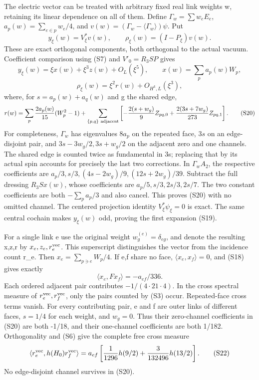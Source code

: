 The electric vector can be treated with arbitrary fixed real link weights w, retaining its linear dependence on all of them. Define \(\Gamma_w=\sum w_eE_e\), \(a_p(w)=\sum_{e\in p}w_e/4\), and \(v(w)=(\Gamma_w-\langle\Gamma_w\rangle)\psi\). Put \[
 y_\xi(w)=V_\xi^*v(w),\qquad
 \rho_\xi(w)=(I-P_\xi)v(w).
\] These are exact orthogonal components, both orthogonal to the actual vacuum. Coefficient comparison using (S7) and \(V'_0=R_3SP\) gives \[
 y_\xi(w)=\xi x(w)+\xi^3z(w)+O_L(\xi^5),\qquad
 x(w)=\sum_pa_p(w)W_p,
\] \[
 \rho_\xi(w)=\xi^2r(w)+O_{H^k,L}(\xi^3),
\tag{S19}
\] where, for \(s=a_p(w)+a_q(w)\) and g the shared edge, \[
 r(w)=\sum_p\frac{2a_p(w)}{15}(W_p^2-1)
       +\sum_{\{p,q\}\ {\rm adjacent}}
       \left[-\frac{2(s+w_g)}9Z_{pq,0}
             +\frac{2(3s+7w_g)}{273}Z_{pq,1}\right].
\tag{S20}
\] For completeness, \(\Gamma_w\) has eigenvalues \(8a_p\) on the repeated face, \(3s\) on an edge-disjoint pair, and \(3s-3w_g/2,3s+w_g/2\) on the adjacent zero and one channels. The shared edge is counted twice as fundamental in 3s; replacing that by its actual spin accounts for precisely the last two corrections. In \(\Gamma_w A_2\), the respective coefficients are \(a_p/3,s/3,(4s-2w_g)/9,(12s+2w_g)/39\). Subtract the full dressing \(R_3Sx(w)\), whose coefficients are \(a_p/5,s/3,2s/3,2s/7\). The two constant coefficients are both \(-\sum_pa_p/3\) and also cancel. This proves (S20) with no omitted channel. The centered projection identity \(V_\xi^*\psi_\xi=0\) is exact. The same central cochain makes \(y_\xi(w)\) odd, proving the first expansion (S19).

For a single link e use the original weight \(w^{(e)}_g=\delta_{eg}\), and denote the resulting x,z,r by \(x_e,z_e,r_e^{\rm vec}\). This superscript distinguishes the vector from the incidence count r\_e. Then \(x_e=\sum_{p\ni e}W_p/4\). If e,f share no face, \(\langle x_e,x_f\rangle=0\), and (S18) gives exactly \[
 \langle x_e,Fx_f\rangle=-a_{ef}/336.
\tag{S21}
\] Each ordered adjacent pair contributes \(-1/(4\cdot21\cdot4)\). In the cross spectral measure of \(r_e^{\rm vec},r_f^{\rm vec}\), only the pairs counted by (S3) occur. Repeated-face cross terms vanish. For every contributing pair, e and f are outer links of different faces, \(s=1/4\) for each weight, and \(w_g=0\). Thus their zero-channel coefficients in (S20) are both -1/18, and their one-channel coefficients are both 1/182. Orthogonality and (S6) give the complete free cross measure \[
 \langle r_e^{\rm vec},h(H_0)r_f^{\rm vec}\rangle
 =a_{ef}\left[\frac1{1296}h(9/2)+\frac3{132496}h(13/2)\right].
\tag{S22}
\] No edge-disjoint channel survives in (S20).

